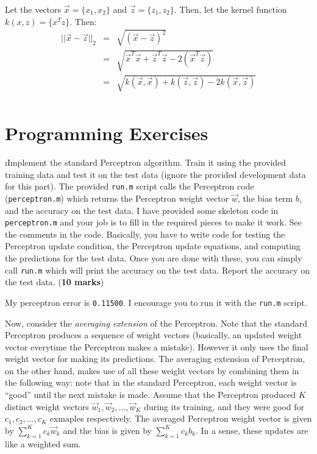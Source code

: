 \documentclass[fleqn]{article}
\begin{document}
\begin{solution}
Let the vectors $\vec{x} = \{x_1, x_2\}$ and $\vec{z} = \{z_1, z_2\}$. Then, let the kernel function $k(x, z) = \{x^Tz\}$. Then:
\begin{eqnarray*}
||\vec{x} - \vec{z}||_2 & = & \sqrt{(\vec{x} - \vec{z})^2} \\
& = & \sqrt{\vec{x}^T\vec{x} + \vec{z}^T\vec{z} - 2 (\vec{x}^T \vec{z})} \\
& = & \sqrt{k(\vec{x}, \vec{x}) + k(\vec{z}, \vec{z}) - 2 k(\vec{x}, \vec{z})} \\
\end{eqnarray*}
\end{solution}

\ene

\section{Programming Exercises}

\bee

\i Implement the standard Perceptron algorithm. Train it using
the provided training data and test it on the test data (ignore
the provided development data for this part). The provided
\texttt{run.m} script calls the Perceptron code (\texttt{perceptron.m}) 
which returns the Perceptron weight vector $\vec{w}$, the bias term 
$b$, and the accuracy on the test data. I have provided some skeleton code 
in \texttt{perceptron.m} and your job is to fill in the required 
pieces to make it work. See the comments in the code. Basically, you 
have to write code for testing the Perceptron update condition, the 
Perceptron update equations, and computing the predictions for the test 
data. Once you are done with these, you can simply call \texttt{run.m} 
which will print the accuracy on the test data. Report the accuracy on
the test data. (\textbf{10 marks})

\begin{solution}
My perceptron error is \texttt{0.11500}. I encourage you to run it with the \texttt{run.m} script.
\end{solution}

Now, consider the \textit{averaging extension} of the Perceptron. Note that
the standard Perceptron produces a sequence of weight vectors
(basically, an updated weight vector everytime the Perceptron makes a mistake).
However it only uses the final weight vector for making its predictions.
The averaging extension of Perceptron, on the other hand, makes use of all these
weight vectors by combining them in the following way:
note that in the standard Perceptron, each weight vector is ``good'' until 
the next mistake is made. Assume that the Perceptron produced $K$ distinct 
weight vectors $\vec{w}_1,\vec{w}_2,\ldots,\vec{w}_K$ during its training, 
and they were good for $c_1,c_2,\ldots, c_K$ exmaples respectively. The 
averaged Perceptron weight vector is given by $\sum_{k=1}^K c_k \vec{w}_k$ 
and the bias is given by $\sum_{k=1}^K c_k b_k$. In a sense, these updates
are like a weighted sum.
\end{document}
